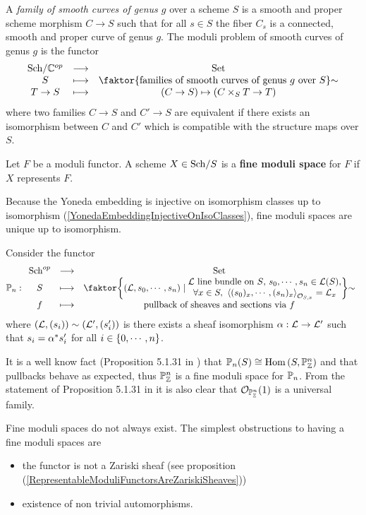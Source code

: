 \begin{example}
A \textit{family of smooth curves of genus $g$} over a scheme $S$ is a smooth and proper scheme morphism $C\to S$ such that for all $s\in S$ the fiber $C_s$ is a connected, smooth and proper curve of genus $g$. The moduli problem of smooth curves of genus $g$ is the functor
\[\functorDef{\Sch\C\op}{\Set}{S}{\quot{\cpa{\text{families of smooth curves of genus $g$ over $S$}}}\sim}{T\to S}{(C\to S)\mapsto (C\times_S T\to T)}\]
where two families $C\to S$ and $C'\to S$ are equivalent if there exists an isomorphism between $C$ and $C'$ which is compatible with the structure maps over $S$.
\end{example}

\begin{definition}
Let $F$ be a moduli functor. A scheme $X\in {\mathrm{Sch}}/{S}$ is a \textbf{fine moduli space} for $F$ if $X$ represents $F$.
\end{definition}

\begin{remark}
Because the Yoneda embedding is injective on isomorphism classes up to isomorphism (\ref{YonedaEmbeddingInjectiveOnIsoClasses}), fine moduli spaces are unique up to isomorphism.
\end{remark}

\begin{example}
Consider the functor
\[\Pj_n:\functorDef{\mathrm{Sch}\op}{\Set}{S}{\quot{\cpa{(\Lc,s_0,\cdots,s_n)\mid \emat{\Lc\text{ line bundle on $S$, }s_0,\cdots,s_n\in\Lc(S),\\\forall x\in S,\ \ps{(s_0)_x,\cdots,(s_n)_x}_{\Oc_{S,x}}=\Lc_x}}}\sim}{f}{\text{pullback of sheaves and sections via $f$}}\]
where $(\mathcal{L},(s_i))\sim (\mathcal{L}',(s_i'))$ is there exists a sheaf isomorphism $\alpha:\mathcal{L}\to\mathcal{L}'$ such that $s_i=\alpha^\ast s_i'$ for all $i\in\left\{{0,\cdots, n}\right\}$.\medskip

It is a well know fact (Proposition 5.1.31 in \cite{QingLiu}) that $\mathbb{P}_n(S)\cong \mathrm{Hom}\,(S,\mathbb{P}^n_{\mathbb{Z}})$ and that pullbacks behave as expected, thus $\mathbb{P}^n_{\mathbb{Z}}$ is a fine moduli space for $\mathbb{P}_n$.
From the statement of Proposition 5.1.31 in \cite{QingLiu} it is also clear that $\mathcal{O}_{\mathbb{P}^n_{\mathbb{Z}}}(1)$ is a universal family.
\end{example}

Fine moduli spaces do not always exist. The simplest obstructions to having a fine moduli spaces are
\begin{itemize}
\item the functor is not a Zariski sheaf (see proposition (\ref{RepresentableModuliFunctorsAreZariskiSheaves}))
\item existence of non trivial automorphisms.
\end{itemize}

